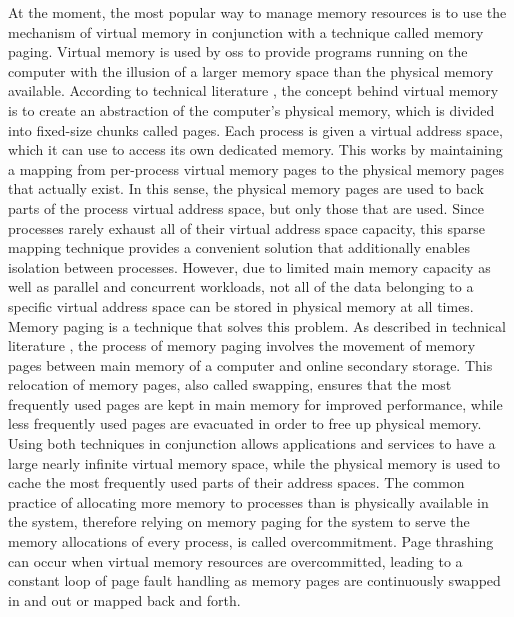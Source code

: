 At the moment, the most popular way to manage memory resources is to use the mechanism of virtual memory in conjunction with a technique called memory paging.
Virtual memory is used by \acp{os} to provide programs running on the computer with the illusion of a larger memory space than the physical memory available.
According to technical literature \cite{mos2009}, the concept behind virtual memory is to create an abstraction of the computer's physical memory, which is divided into fixed-size chunks called pages.
Each process is given a virtual address space, which it can use to access its own dedicated memory.
This works by maintaining a mapping from per-process virtual memory pages to the physical memory pages that actually exist.
In this sense, the physical memory pages are used to back parts of the process virtual address space, but only those that are used.
Since processes rarely exhaust all of their virtual address space capacity, this sparse mapping technique provides a convenient solution that additionally enables isolation between processes.
However, due to limited main memory capacity as well as parallel and concurrent workloads, not all of the data belonging to a specific virtual address space can be stored in physical memory at all times.
Memory paging is a technique that solves this problem.
As described in technical literature \cite{mos2009}, the process of memory paging involves the movement of memory pages between main memory of a computer and online secondary storage.
This relocation of memory pages, also called swapping, ensures that the most frequently used pages are kept in main memory for improved performance, while less frequently used pages are evacuated in order to free up physical memory.
Using both techniques in conjunction allows applications and services to have a large nearly infinite virtual memory space, while the physical memory is used to cache the most frequently used parts of their address spaces.
The common practice of allocating more memory to processes than is physically available in the system, therefore relying on memory paging for the system to serve the memory allocations of every process, is called overcommitment.
Page thrashing can occur when virtual memory resources are overcommitted, leading to a constant loop of page fault handling as memory pages are continuously swapped in and out or mapped back and forth.

